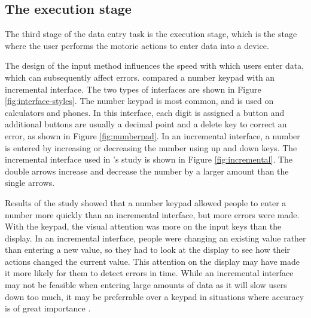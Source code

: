 
\subsection{The execution stage}
The third stage of the data entry task is the execution stage, which is the stage where the user performs the motoric actions to enter data into a device.

The design of the input method influences the speed with which users enter data, which can subsequently affect errors. \citet{Oladimeji2011} compared a number keypad with an incremental interface. The two types of interfaces are shown in Figure \ref{fig:interface-styles}. The number keypad is most common, and is used on calculators and phones. In this interface, each digit is assigned a button and additional buttons are usually a decimal point and a delete key to correct an error, as shown in Figure \ref{fig:numberpad}. In an incremental interface, a number is entered by increasing or decreasing the number using up and down keys. The incremental interface used in \citeauthor{Oladimeji2011}'s study is shown in Figure \ref{fig:incremental}. The double arrows increase and decrease the number by a larger amount than the single arrows. 

Results of the study showed that a number keypad allowed people to enter a number more quickly than an incremental interface, but more errors were made. With the keypad, the visual attention was more on the input keys than the display. In an incremental interface, people were changing an existing value rather than entering a new value, so they had to look at the display to see how their actions changed the current value. This attention on the display may have made it more likely for them to detect errors in time. While an incremental interface may not be feasible when entering large amounts of data as it will slow users down too much, it may be preferrable over a keypad in situations where accuracy is of great importance \citep{Thimbleby2011}. 

